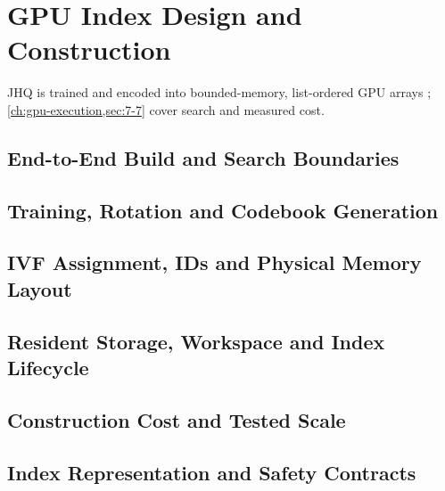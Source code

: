 \chapter{GPU Index Design and Construction}
\label{ch:architecture}
JHQ is trained and encoded into bounded-memory, list-ordered GPU arrays \cite{jhq}; \cref{ch:gpu-execution,sec:7-7} cover search and measured cost.

\section{End-to-End Build and Search Boundaries}
\label{sec:4-1}


\section{Training, Rotation and Codebook Generation}
\label{sec:4-2}


\section{IVF Assignment, IDs and Physical Memory Layout}
\label{sec:4-3}


\section{Resident Storage, Workspace and Index Lifecycle}
\label{sec:4-4}


\section{Construction Cost and Tested Scale}
\label{sec:4-5}


\section{Index Representation and Safety Contracts}
\label{sec:4-6}

